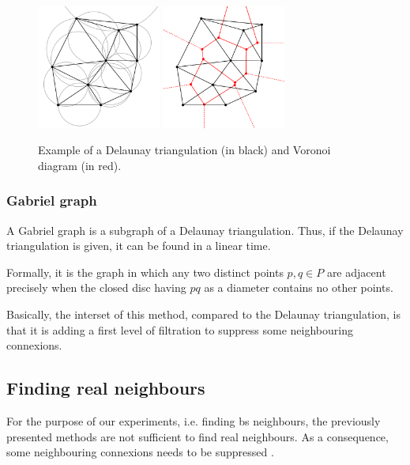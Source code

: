 \documentclass[lettersize,journal,english]{IEEEtran}
\begin{document}
            \begin{figure}
                \centering
                \includegraphics[width=1.6in]{images/illus_graphs/Delaunay_circumcircles_vectorial.png}
                \includegraphics[width=1.6in]{images/illus_graphs/Delaunay_Voronoi.png}
                \caption{Example of a Delaunay triangulation (in black) and Voronoi diagram (in red).}
                \label{fig:del_tri}
            \end{figure}

        \subsubsection{Gabriel graph}
            A Gabriel graph \cite{10.2307/2412323} is a subgraph of a Delaunay triangulation. Thus, if the Delaunay triangulation is given, it can be found in a linear time. 

            Formally, it is the graph in which any two distinct points $p, q \in P$ are adjacent precisely when the closed disc having $pq$ as a diameter contains no other points.

            Basically, the interset of this method, compared to the Delaunay triangulation, is that it is adding a first level of filtration to suppress some neighbouring connexions.

    \subsection{Finding real neighbours}
        For the purpose of our experiments, i.e. finding \acrshort{bs} neighbours, the previously presented methods are not sufficient to find real neighbours.
        As a consequence, some neighbouring connexions needs to be suppressed \cite{patent_neighs}.
\end{document}
